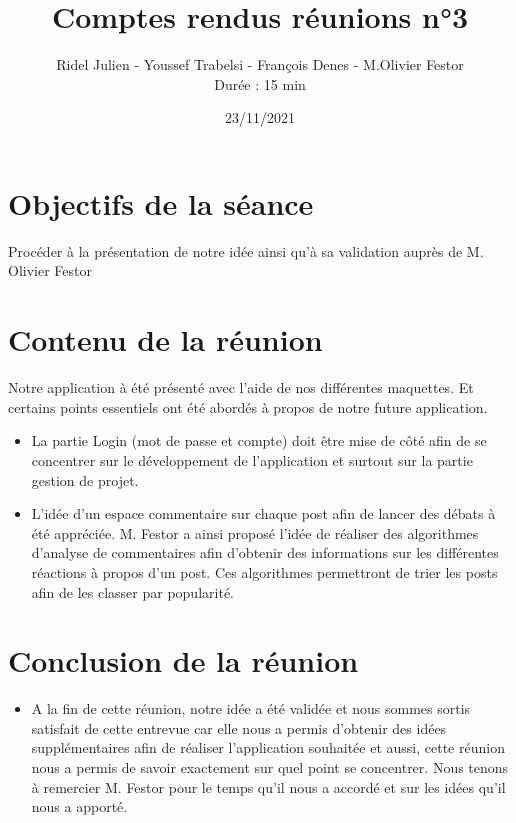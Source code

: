 \documentclass{article}
\title{\Huge Comptes rendus réunions n°3}
\author{Ridel Julien - Youssef Trabelsi - François Denes - M.Olivier Festor \\ Durée : 15 min}
\date{23/11/2021}
\begin{document}
\maketitle

\section{\huge Objectifs de la séance}

\Large Procéder à la présentation de notre idée ainsi qu'à sa validation auprès de M. Olivier Festor

\section{\huge Contenu de la réunion } 
\Large Notre application à été présenté avec l'aide de nos différentes maquettes. Et certains points essentiels ont été abordés à propos de notre future application.

\begin{itemize}

    \item \Large La partie Login (mot de passe et compte) doit être mise de côté afin de se concentrer sur le développement de l'application et surtout sur la partie gestion de projet.
    
    \item \Large L'idée d'un espace commentaire sur chaque post afin de lancer des débats à été appréciée. M. Festor a ainsi proposé l'idée de réaliser des algorithmes d'analyse de commentaires afin d'obtenir des informations sur les différentes réactions à propos d'un post. Ces algorithmes permettront de trier les posts afin de les classer par popularité.
\end{itemize}

\section{\huge Conclusion de la réunion}

\begin{itemize}
\item \Large A la fin de cette réunion, notre idée a été validée et nous sommes sortis satisfait de cette entrevue car elle nous a permis d'obtenir des idées supplémentaires afin de réaliser l'application souhaitée et aussi, cette réunion nous a permis de savoir exactement sur quel point se concentrer. Nous tenons à remercier M. Festor pour le temps qu'il nous a accordé et sur les idées qu'il nous a apporté.

\end{itemize}
\end{document}
